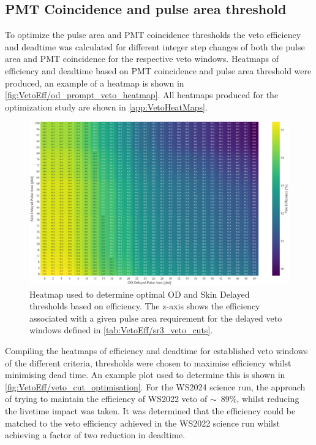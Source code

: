 \subsection{PMT Coincidence and pulse area threshold}
To optimize the pulse area and PMT coincidence thresholds the veto efficiency and deadtime was calculated for different integer step changes of both the pulse area and PMT coincidence for the respective veto windows. Heatmaps of efficiency and deadtime based on PMT coincidence and pulse area threshold were produced, an example of a heatmap is shown in \autoref{fig:VetoEff/od_prompt_veto_heatmap}. All heatmaps produced for the optimization study are shown in \autoref{app:VetoHeatMaps}.

\begin{figure}
	\centering
	\includegraphics[width=\textwidth]{figures/VetoEfficiency/Heatmap600us_ODDelayedSkinDelayedThresholds.png}
	\caption{Heatmap used to determine optimal OD and Skin Delayed thresholds based on efficiency.
		The z-axis shows the efficiency associated with a given pulse area requirement for the delayed veto windows defined in \autoref{tab:VetoEff/sr3_veto_cuts}.
	}
	\label{fig:VetoEff/od_prompt_veto_heatmap}
\end{figure}

Compiling the heatmaps of efficiency and deadtime for established veto windows of the different criteria, thresholds were chosen to maximise efficiency whilst minimising dead time. An example plot used to determine this is shown in \autoref{fig:VetoEff/veto_cut_optimisation}.
For the WS2024 science run, the approach of trying to maintain the efficiency of WS2022 veto of $\sim$~89\%, whilst reducing the livetime impact was taken. It was determined that the efficiency could be matched to the veto efficiency achieved in the WS2022 science run whilst achieving a factor of two reduction in deadtime.

